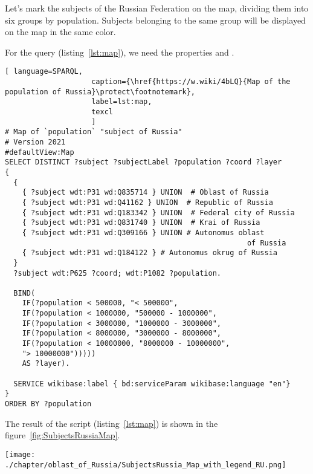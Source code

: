 Let's mark the subjects of the Russian Federation on the map, dividing them into six groups by population. Subjects belonging to the same group will be displayed on the map in the same color.

For the query (listing~\protect\ref{lst:map}), we need the properties  and .


\begin{lstlisting}[ language=SPARQL, 
                    caption={\href{https://w.wiki/4bLQ}{Map of the population of Russia}\protect\footnotemark},
                    label=lst:map,
                    texcl 
                    ]
# Map of `population` "subject of Russia"
# Version 2021
#defaultView:Map
SELECT DISTINCT ?subject ?subjectLabel ?population ?coord ?layer
{
  {
    { ?subject wdt:P31 wd:Q835714 } UNION  # Oblast of Russia
    { ?subject wdt:P31 wd:Q41162 } UNION  # Republic of Russia
    { ?subject wdt:P31 wd:Q183342 } UNION  # Federal city of Russia
    { ?subject wdt:P31 wd:Q831740 } UNION  # Krai of Russia
    { ?subject wdt:P31 wd:Q309166 } UNION # Autonomus oblast 
                                                        of Russia
    { ?subject wdt:P31 wd:Q184122 } # Autonomus okrug of Russia
  }   
  ?subject wdt:P625 ?coord; wdt:P1082 ?population.
  
  BIND(
    IF(?population < 500000, "< 500000",
    IF(?population < 1000000, "500000 - 1000000",
    IF(?population < 3000000, "1000000 - 3000000",
    IF(?population < 8000000, "3000000 - 8000000",
    IF(?population < 10000000, "8000000 - 10000000",
    "> 10000000")))))
    AS ?layer).
  
  SERVICE wikibase:label { bd:serviceParam wikibase:language "en"}
}
ORDER BY ?population
\end{lstlisting}%


The result of the script (listing~\protect\ref{lst:map}) is shown in the figure~\ref{fig:SubjectsRussiaMap}.

\begin{figure*}[h]
	\texttt{[image: ./chapter/oblast\_of\_Russia/SubjectsRussia\_Map\_with\_legend\_RU.png]}
	\caption[Map of the population by subjects of Russia, 2021.]{Population map by subjects of Russia, 2021. The subjects are divided into six groups by population and marked with different colors depending on the group the subject belongs to. The map is based on the data received by the request~\protect\ref{lst:map}.}%
      \label{fig:SubjectsRussiaMap}%
\end{figure*} 


